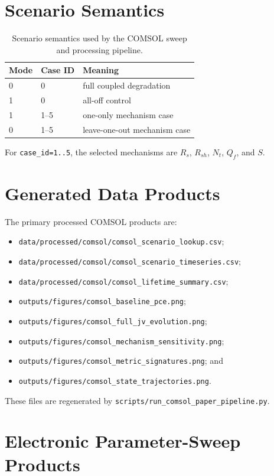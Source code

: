 \section{Scenario Semantics}

\begin{table}[H]
\centering
\begin{tabular}{lll}
\toprule
Mode & Case ID & Meaning \\
\midrule
0 & 0 & full coupled degradation \\
1 & 0 & all-off control \\
1 & 1--5 & one-only mechanism case \\
0 & 1--5 & leave-one-out mechanism case \\
\bottomrule
\end{tabular}
\caption{Scenario semantics used by the COMSOL sweep and processing pipeline.}
\label{tab:scenario_semantics}
\end{table}

For \texttt{case\_id=1..5}, the selected mechanisms are $R_s$, $R_{sh}$,
$N_t$, $Q_f$, and $S$.

\section{Generated Data Products}

The primary processed COMSOL products are:
\begin{itemize}
\item \texttt{data/processed/comsol/comsol\_scenario\_lookup.csv};
\item \texttt{data/processed/comsol/comsol\_scenario\_timeseries.csv};
\item \texttt{data/processed/comsol/comsol\_lifetime\_summary.csv};
\item \texttt{outputs/figures/comsol\_baseline\_pce.png};
\item \texttt{outputs/figures/comsol\_full\_jv\_evolution.png};
\item \texttt{outputs/figures/comsol\_mechanism\_sensitivity.png};
\item \texttt{outputs/figures/comsol\_metric\_signatures.png}; and
\item \texttt{outputs/figures/comsol\_state\_trajectories.png}.
\end{itemize}

These files are regenerated by
\texttt{scripts/run\_comsol\_paper\_pipeline.py}.

\section{Electronic Parameter-Sweep Products}


